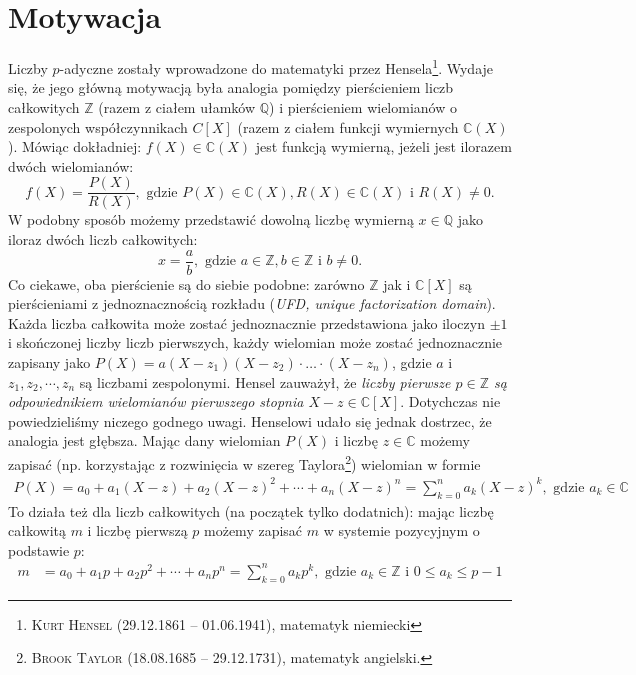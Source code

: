 \documentclass[a4paper,fleqn,9pt]{extarticle}
\begin{document}
\section{Motywacja}
Liczby $p$-adyczne zostały wprowadzone do matematyki przez Hensela\footnote{\textsc{Kurt Hensel} (29.12.1861 -- 01.06.1941), matematyk niemiecki}.
Wydaje się, że jego główną motywacją była analogia pomiędzy pierścieniem liczb całkowitych $\mathbb Z$ (razem z ciałem ułamków $\mathbb Q$) i pierścieniem wielomianów o zespolonych współczynnikach $C[X]$ (razem z ciałem funkcji wymiernych $\mathbb C(X)$).
Mówiąc dokładniej: $f(X) \in \mathbb C(X)$ jest funkcją wymierną, jeżeli jest ilorazem dwóch wielomianów: 
\begin{equation*}
f(X) = \frac{P(X)}{R(X)}, \text{ gdzie }
P(X) \in \mathbb C(X),
R(X) \in \mathbb C(X) \text { i }
R(X) \neq 0.
\end{equation*}
W podobny sposób możemy przedstawić dowolną liczbę wymierną $x \in \mathbb Q$ jako iloraz dwóch liczb całkowitych:
\begin{equation*}
x = \frac{a}{b}, \text{ gdzie }
a \in \mathbb Z,
b \in \mathbb Z \text { i }
b \neq 0.
\end{equation*}
Co ciekawe, oba pierścienie są do siebie podobne: zarówno $\mathbb Z$ jak i $\mathbb C[X]$ są pierścieniami z jednoznacznością rozkładu (\emph{UFD, unique factorization domain}).
Każda liczba całkowita może zostać jednoznacznie przedstawiona jako iloczyn $\pm 1$ i skończonej liczby liczb pierwszych, każdy wielomian może zostać jednoznacznie zapisany jako $P(X) = a(X - z_1)(X - z_2)\cdot\ldots\cdot(X - z_n)$, gdzie $a$ i $z_1, z_2, \cdots, z_n$ są liczbami zespolonymi.
Hensel zauważył, że \emph{liczby pierwsze $p\in\mathbb Z$ są odpowiednikiem wielomianów pierwszego stopnia $X - z \in \mathbb C[X]$}.
Dotychczas nie powiedzieliśmy niczego godnego uwagi.
Henselowi udało się jednak dostrzec, że analogia jest głębsza. 
Mając dany wielomian $P(X)$ i liczbę $z \in \mathbb C$ możemy zapisać (np. korzystając z rozwinięcia w szereg Taylora\footnote{\textsc{Brook Taylor} (18.08.1685 -- 29.12.1731), matematyk angielski.}) wielomian w formie
\begin{align*}
P(X) = a_0 + a_1(X-z) + a_2(X-z)^2 + \cdots + a_n(X-z)^n
     = \sum_{k=0}^n a_k(X-z)^k, \text{ gdzie } a_k \in\mathbb C
\end{align*}
To działa też dla liczb całkowitych (na początek tylko dodatnich): mając liczbę całkowitą $m$ i liczbę pierwszą $p$ możemy zapisać $m$ w systemie pozycyjnym o podstawie $p$:
\begin{align*}
m & = a_0 + a_1p+ a_2p^2 + \cdots + a_np^n
    = \sum_{k=0}^n a_kp^k, \text{ gdzie } a_k \in \mathbb Z \text{ i } 0 \le a_k \le p-1
\end{align*}
\end{document}
